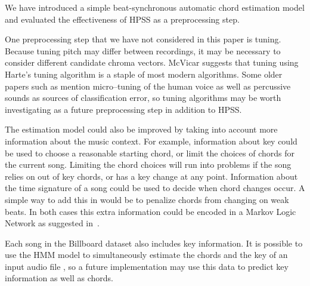 \documentclass{article}
\begin{document}
We have introduced a simple beat-synchronous automatic chord estimation model
and evaluated the effectiveness of HPSS as a preprocessing step.

One preprocessing step that we have not considered in this paper is tuning.
Because tuning pitch may differ between recordings, it may be necessary to
consider different candidate chroma vectors. McVicar\cite{McVicar:00} suggests that
tuning using Harte's tuning algorithm is a staple of most modern algorithms.
Some older papers such as \cite{Zenz:20} mention micro--tuning of the human
voice as well as percussive sounds as sources of classification error, so
tuning algorithms may be worth investigating as a future preprocessing step in
addition to HPSS.

The estimation model could also be improved by taking into account more
information about the music context. For example, information about key could
be used to choose a reasonable starting chord, or limit the choices of chords
for the current song. Limiting the chord choices will run into problems if the
song relies on out of key chords, or has a key change at any point. Information
about the time signature of a song could be used to decide when chord changes
occur. A simple way to add this in would be to penalize chords from changing on
weak beats. In both cases this extra information could be encoded in a Markov
Logic Network as suggested in~\cite{Papadopoulus:04}.

Each song in the Billboard dataset also includes key information. It is
possible to use the HMM model to simultaneously estimate the chords and the key
of an input audio file \cite{McVicar:00}, so a future implementation may use
this data to predict key information as well as chords.
\end{document}
